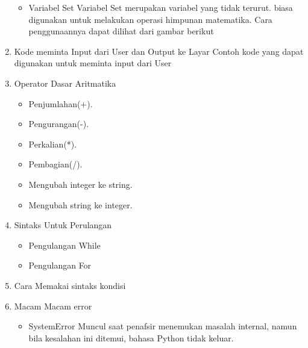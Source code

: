 \begin{enumerate}
\begin{itemize}
    \item Variabel Set
    Variabel Set merupakan variabel yang tidak terurut. biasa digunakan untuk melakukan operasi himpunan matematika. Cara penggunaannya dapat dilihat dari gambar berikut
    
\end{itemize}

\item Kode meminta Input dari User dan Output ke Layar
Contoh kode yang dapat digunakan untuk meminta input dari User


\item Operator Dasar Aritmatika
\begin{itemize}
    \item Penjumlahan(+).


    \item Pengurangan(-).


    \item Perkalian(*).


    \item Pembagian(/).


    \item Mengubah integer ke string.


    \item Mengubah string ke integer.

\end{itemize}

    \item Sintaks Untuk Perulangan
\begin{itemize}
    \item Pengulangan While

    \item Pengulangan For

\end{itemize}

\item Cara Memakai sintaks kondisi


\item Macam Macam error
\begin{itemize}
    \item SystemError
        Muncul saat penafsir menemukan masalah internal, namun bila kesalahan ini ditemui, bahasa Python tidak keluar.


\end{itemize}
\end{enumerate}
